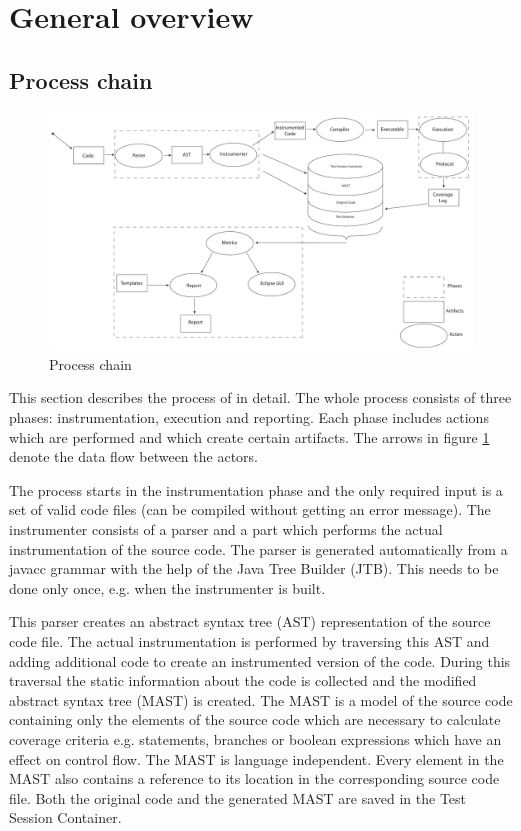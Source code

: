 \section{General overview} \label{Overview}
\subsection{Process chain}
\label{Process_chain}
\begin{figure}[hbtp]
 \centering
 \includegraphics[width=\textwidth]{images/Overview/process_chain.pdf}
 \caption{Process chain}
 \label{figure:Overview:process_chain}
\end{figure}

This section describes the process of \gbt in detail. The whole process consists
of three phases: instrumentation, execution and reporting. Each phase includes
actions which are performed and which create certain artifacts. The arrows in
figure \ref{figure:Overview:process_chain} denote the data flow between the actors.
\par
The process starts in the instrumentation phase and the only required input is a
set of valid code files (can be compiled without getting an error message). The
instrumenter consists of a parser and a part which performs the actual
instrumentation of the source code. The parser is generated automatically from
 a javacc grammar with the help of the Java Tree Builder (JTB). This needs to be
done only once, e.g. when the instrumenter is built.
\par
This parser
 creates an abstract syntax tree (AST) representation of the source code file. The
 actual instrumentation is performed by traversing this AST and adding additional
 code to create an instrumented version of the code. During this traversal the 
static information about the code is collected and the modified abstract syntax tree
(MAST) is 
created. The MAST is a model of the source code containing only
the elements of the source code which are necessary to calculate coverage criteria
 e.g. statements, branches or boolean expressions which have an effect on control
flow. The MAST is language independent. Every element in the
MAST also contains a reference to its location in the corresponding
source code file. Both the original code and the generated MAST
are saved in the Test Session Container. 

